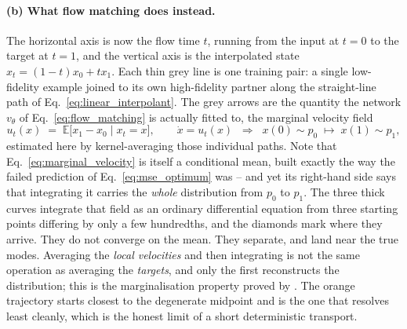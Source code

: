 \documentclass{report}
\begin{document}
\paragraph{(b) What flow matching does instead.} The horizontal axis is now the flow
time \mbox{$t$}, running from the input at \mbox{$t=0$} to the target at \mbox{$t=1$}, and
the vertical axis is the interpolated state \mbox{$x_t = (1-t)x_0 + t x_1$}. Each thin grey
line is one training pair: a single low-fidelity example joined to its own high-fidelity
partner along the straight-line path of Eq.~\eqref{eq:linear_interpolant}. The grey arrows
are the quantity the network \mbox{$v_\theta$} of Eq.~\eqref{eq:flow_matching} is actually
fitted to, the marginal velocity field
\begin{equation}
  u_t(x) \;=\; \mathbb{E}\big[x_1 - x_0 \;\big|\; x_t = x\big],
  \qquad
  \dot x = u_t(x)
  \;\;\Longrightarrow\;\;
  x(0) \sim p_0 \;\longmapsto\; x(1) \sim p_1 ,
  \label{eq:marginal_velocity}
\end{equation}
estimated here by kernel-averaging those individual paths. Note that
Eq.~\eqref{eq:marginal_velocity} is itself a conditional mean, built exactly the way the
failed prediction of Eq.~\eqref{eq:mse_optimum} was -- and yet its right-hand side says
that integrating it carries the \emph{whole} distribution from \mbox{$p_0$} to
\mbox{$p_1$}. The three thick curves integrate that
field as an ordinary differential equation from three starting points differing by only a
few hundredths, and the diamonds mark where they arrive. They do not converge on the mean.
They separate, and land near the true modes. Averaging the \emph{local velocities} and then
integrating is not the same operation as averaging the \emph{targets}, and only the first
reconstructs the distribution; this is the marginalisation property proved by
\citeauthor{lipman_flow_2023} \cite{lipman_flow_2023}. The orange trajectory starts closest
to the degenerate midpoint and is the one that resolves least cleanly, which is the honest
limit of a short deterministic transport.
\end{document}
